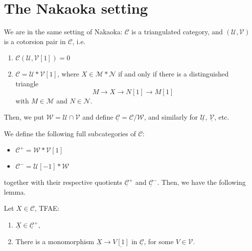 \section{The Nakaoka setting}

We are in the same setting of Nakaoka: $\mathcal{C}$ is a triangulated category,
and $(\mathcal{U},\mathcal{V})$ is a cotorsion pair in $\mathcal{C}$, i.e.
\begin{enumerate}
  \item $\mathcal{C}(\mathcal{U},\mathcal{V}[1])=0$
  \item $\mathcal{C}=\mathcal{U}\ast \mathcal{V}[1]$, where $X\in \mathcal{M}\ast\mathcal{N}$ if and only if there
  is a distinguished triangle
  \begin{equation*}
    M\to X\to N[1] \to M[1]
  \end{equation*}
  with $M\in \mathcal{M}$ and $N\in\mathcal{N}$.
\end{enumerate}

Then, we put $\mathcal{W}=\mathcal{U}\cap\mathcal{V}$ and define $\underline{\mathcal{C}}=\mathcal{C}/\mathcal{W}$,
and similarly for $\underline{\mathcal{U}}$, $\underline{\mathcal{V}}$, etc.

We define the following full subcategories of $\mathcal{C}$:
\begin{itemize}
  \item $\mathcal{C}^+ = \mathcal{W}\ast\mathcal{V}[1]$
  \item $\mathcal{C}^- = \mathcal{U}[-1]\ast\mathcal{W}$
\end{itemize}
together with their respective quotients $\underline{\mathcal{C}}^+$ and $\underline{\mathcal{C}}^-$.
Then, we have the following lemma.

\begin{lemma}\label{sec1:lem1}
  Let $X\in\mathcal{C}$, TFAE:
  \begin{enumerate}
    \item $\underline{X} \in \underline{\mathcal{C}}^+$,
    \item There is a monomorphism $\underline{X}\to \underline{V[1]}$ in
    $\underline{\mathcal{C}}$, for some $V\in\mathcal{V}$.
  \end{enumerate}
\end{lemma}


